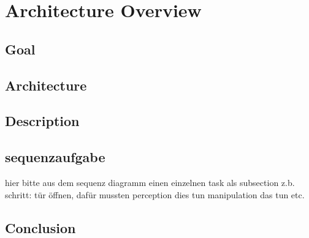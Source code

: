 \documentclass[main.tex]{subfiles}
\begin{document}
	
	\begingroup
	
	\renewcommand{\cleardoublepage}{}
	
	\renewcommand{\clearpage}{}
	
	\chapter{Architecture Overview}
	
	\chapterauthor{}
	
	\section{Goal}
	
	\section{Architecture}
	
	\section{Description}
	
	\section{sequenzaufgabe}
	hier bitte aus dem sequenz diagramm einen einzelnen task als subsection z.b. schritt: tür öffnen, dafür mussten perception dies tun manipulation das tun etc.
	
	\section{Conclusion}
	
	
	\endgroup
	
\end{document}
